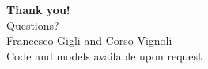 \documentclass[aspectratio=169,11pt]{beamer}
\begin{document}

\begin{frame}
  \begin{center}
    {\Huge\color{UnifiBlue}\textbf{Thank you!}}\\[1.5em]
    {\Large\color{UnifiDark} Questions?}\\[2.5em]
    {\color{UnifiDark}Francesco Gigli and Corso Vignoli}\\[0.3em]
    {\small\color{UnifiDark} Code and models available upon request}
  \end{center}
\end{frame}
\end{document}
